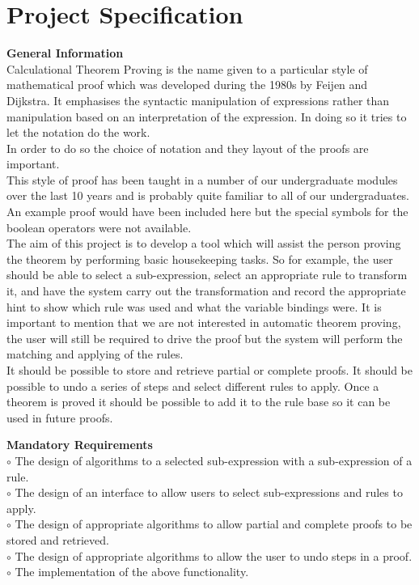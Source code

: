 \documentclass{article}
\newcommand{\enterProblemHeader}[1]{
\nobreak\extramarks{#1}{#1}\nobreak
\nobreak\extramarks{#1}{#1}\nobreak
}
\newcommand{\exitProblemHeader}[1]{
\nobreak\extramarks{#1}{#1 continued on next page\ldots}\nobreak
\nobreak\extramarks{#1}{}\nobreak
}
\newcounter{homeworkProblemCounter} %
\newcommand{\homeworkProblemName}{}
\newenvironment{homeworkProblem}[1][
 \arabic{homeworkProblemCounter}]{ %
\stepcounter{homeworkProblemCounter} %
\renewcommand{\homeworkProblemName}{#1} %
\section{\homeworkProblemName} %
\enterProblemHeader{} %
}{
\exitProblemHeader{} %
}
\begin{document}
\begin{homeworkProblem}[Project Specification]
\begin{description}

\item \textbf{General Information}\\
Calculational Theorem Proving is the name given to a particular style of mathematical proof which
was developed during the 1980s by Feijen and Dijkstra. It emphasises the syntactic manipulation
of expressions rather than manipulation based on an interpretation of the expression. In doing so it tries to let the notation do the work.\\

In order to do so the choice of notation and they layout of the proofs are important.\\

This style of proof has been taught in a number of our undergraduate modules over the last 10
years and is probably quite familiar to all of our undergraduates. An example proof would have
been included here but the special symbols for the boolean operators were not available.\\

The aim of this project is to develop a tool which will assist the person proving the theorem
by performing basic housekeeping tasks. So for example, the user should be able to select a
sub-expression, select an appropriate rule to transform it, and have the system carry out the
transformation and record the appropriate hint to show which rule was used and what the variable bindings were. It is important to mention that we are not interested in automatic theorem proving, the user will still be required to drive the proof but the system will perform the matching and applying of the rules.\\

It should be possible to store and retrieve partial or complete proofs. It should be possible to undo a series of steps and select different rules to apply. Once a theorem is proved it should be possible to add it to the rule base so it can be used in future proofs.

\item \textbf{Mandatory Requirements}\\
$\circ$ The design of algorithms to a selected sub-expression with a sub-expression of a rule.\\
$\circ$ The design of an interface to allow users to select sub-expressions and rules to apply.\\
$\circ$ The design of appropriate algorithms to allow partial and complete proofs to be stored and retrieved.\\
$\circ$ The design of appropriate algorithms to allow the user to undo steps in a proof.\\
$\circ$ The implementation of the above functionality.


\end{description}
\end{homeworkProblem}
\end{document}
